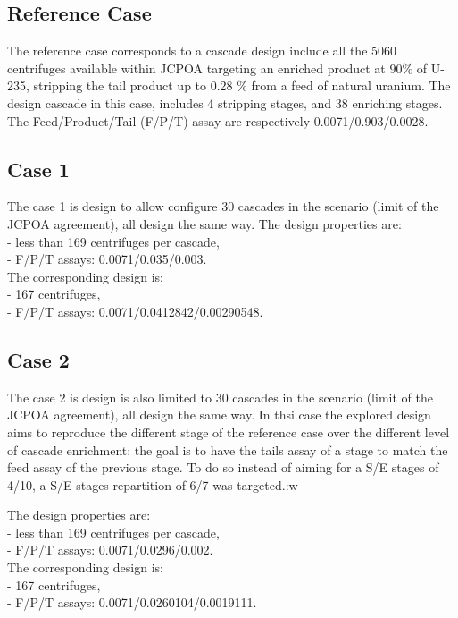 \documentclass{anstrans}
\begin{document}
\subsection{Reference Case}
The reference case corresponds to a cascade design include all the 5060
centrifuges available within JCPOA targeting an enriched product at $90\%$ of U-235,
stripping the tail product up to 0.28 $\%$ from a feed of natural uranium. 
The design cascade in this case, includes 4 stripping stages, and 38 enriching
stages. The Feed/Product/Tail (F/P/T) assay are respectively
0.0071/0.903/0.0028.

\subsection{Case 1}
The case 1 is design to allow configure 30 cascades in the scenario (limit of
the JCPOA agreement), all design the same way. The design properties are:\\
- less than 169 centrifuges per cascade,\\
- F/P/T assays: 0.0071/0.035/0.003.\\
The corresponding design is:\\
- 167 centrifuges,\\
- F/P/T assays: 0.0071/0.0412842/0.00290548.\\

\subsection{Case 2}
The case 2 is design is also limited to 30 cascades in the scenario (limit of
the JCPOA agreement), all design the same way. In thsi case the explored design
aims to reproduce the different stage of the reference case over the different
level of cascade enrichment: the goal is to have the tails assay of a stage to
match the feed assay of the previous stage. To do so instead of aiming for a
S/E stages of 4/10, a S/E stages repartition of 6/7 was targeted.:w


The design properties are:\\
- less than 169 centrifuges per cascade,\\
- F/P/T assays: 0.0071/0.0296/0.002.\\%
The corresponding design is:\\
- 167 centrifuges,\\
- F/P/T assays: 0.0071/0.0260104/0.0019111.\\
\end{document}
